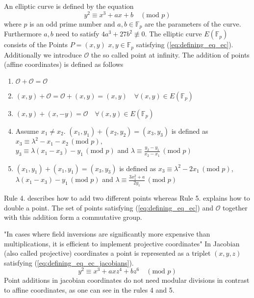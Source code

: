 An elliptic curve is defined by the equation
\begin{equation}\label{eq:defining_eq_ec}
y^2 \equiv x^3 + ax + b \quad (\text{mod } p)
\end{equation}
where $p$ is an odd prime number and $a,b \in \mathbb{F}_p$ are the parameters of the curve. Furthermore $a, b$ need to satisfy $4a^3 + 27b^2 \not\equiv 0$. The elliptic curve $E\left(\mathbb{F}_p\right)$ consists of the Points $P=(x,y)$ $x,y \in \mathbb{F}_p$ satisfying (\ref{eq:defining_eq_ec}). Additionally we introduce $\mathcal{O}$ the so called point at infinity. The addition of points (affine coordinates) is defined as follows \cite{Brown:2009}
\begin{enumerate}
\item{$\mathcal{O} + \mathcal{O} = \mathcal{O}$}
\item{$(x,y) + \mathcal{O} = \mathcal{O} + (x,y) = (x,y) \quad \forall (x,y) \in E(\mathbb{F}_p)$}
\item{$(x,y) + (x,-y) = \mathcal{O} \quad \forall (x,y) \in E(\mathbb{F}_p)$}
\item{Assume  $x_1 \neq x_2$. $(x_1, y_1) + (x_2, y_2) = (x_3, y_3)$ is defined as $x_3 \equiv \lambda^2 - x_1 - x_2 \, (\text{mod } p),$ \\ $y_3 \equiv \lambda(x_1 - x_3) - y_1 \, (\text{mod } p)$ and $\lambda \equiv \frac{y_2 - y_1}{x_2 - x_1} \, (\text{mod } p)$}
\item{$(x_1, y_1) + (x_1, y_1) = (x_3, y_3)$ is defined as $x_3 \equiv \lambda^2 -2 x_1 \, (\text{mod } p)$, $\lambda (x_1 - x_3) - y_1  \, (\text{mod } p)$ and $\lambda \equiv \frac{3 x_1^2 + a}{2y_1} \, (\text{mod } p)$}
\end{enumerate}
Rule 4. describes how to add two different points whereas Rule 5. explains how to double a point. The set of points satisfying (\ref{eq:defining_eq_ec}) and $\mathcal{O}$ together with this addition form a commutative group.

"In cases where field inversions are significantly more expensive than multiplications, it is efficient to implement projective coordinates" \cite{Blake:1999} In Jacobian (also called projective) coordinates a point is represented as a triplet $(x,y,z)$ satisfying (\ref{eq:defining_eq_ec_jacobians}).
\begin{equation}\label{eq:defining_eq_ec_jacobians}
y^2 \equiv x^3 + axz^4 + bz^6 \quad (\text{mod } p)
\end{equation}
Point additions in jacobian coordinates \cite[p. 59-60]{Blake:1999} do not need modular divisions in contrast to affine coordinates, as one can see in the rules 4 and 5.

